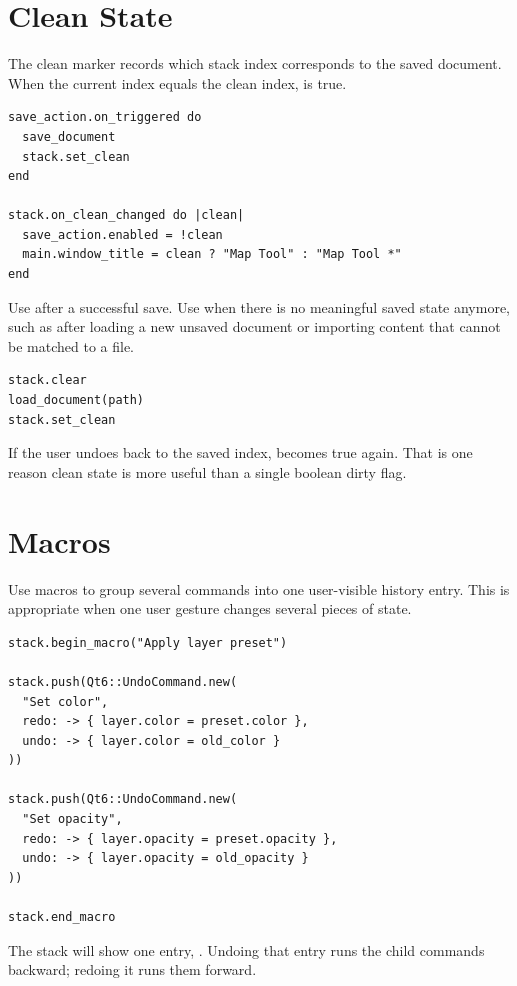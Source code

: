 \section{Clean State}

The clean marker records which stack index corresponds to the saved document. When the current index equals the clean index,  is true.

\begin{lstlisting}[style=crystal]
save_action.on_triggered do
  save_document
  stack.set_clean
end

stack.on_clean_changed do |clean|
  save_action.enabled = !clean
  main.window_title = clean ? "Map Tool" : "Map Tool *"
end
\end{lstlisting}

Use  after a successful save. Use  when there is no meaningful saved state anymore, such as after loading a new unsaved document or importing content that cannot be matched to a file.

\begin{lstlisting}[style=crystal]
stack.clear
load_document(path)
stack.set_clean
\end{lstlisting}

If the user undoes back to the saved index,  becomes true again. That is one reason clean state is more useful than a single boolean dirty flag.

\section{Macros}

Use macros to group several commands into one user-visible history entry. This is appropriate when one user gesture changes several pieces of state.

\begin{lstlisting}[style=crystal]
stack.begin_macro("Apply layer preset")

stack.push(Qt6::UndoCommand.new(
  "Set color",
  redo: -> { layer.color = preset.color },
  undo: -> { layer.color = old_color }
))

stack.push(Qt6::UndoCommand.new(
  "Set opacity",
  redo: -> { layer.opacity = preset.opacity },
  undo: -> { layer.opacity = old_opacity }
))

stack.end_macro
\end{lstlisting}

The stack will show one entry, . Undoing that entry runs the child commands backward; redoing it runs them forward.

